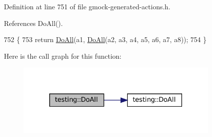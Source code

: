Definition at line 751 of file gmock-\/generated-\/actions.\+h.



References Do\+All().


\begin{DoxyCode}
752                             \{
753   \textcolor{keywordflow}{return} \hyperlink{namespacetesting_a79ac222c485c7aa0a1774bee17dadb10}{DoAll}(a1, \hyperlink{namespacetesting_a79ac222c485c7aa0a1774bee17dadb10}{DoAll}(a2, a3, a4, a5, a6, a7, a8));
754 \}
\end{DoxyCode}
Here is the call graph for this function\+:
\nopagebreak
\begin{figure}[H]
\begin{center}
\leavevmode
\includegraphics[width=282pt]{namespacetesting_a2c0e69056a8e5bc4ddc2308ba0af5214_cgraph}
\end{center}
\end{figure}
\mbox{\label{namespacetesting_a3479e234532d82d0a093f7ffdb3ac254}} 
